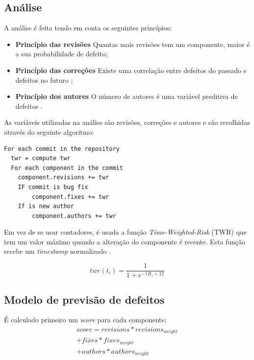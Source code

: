\documentclass[9pt,a4paper]{extarticle}
\begin{document}
\begin{multicols}{2}
\subsection{Análise}
A análise é feita tendo em conta os seguintes princípios:

\begin{itemize}
\item \textbf{Princípio das revisões} Quantas mais revisões tem um componente,
maior é a sua probabilidade de defeito\cite{859533};

\item \textbf{Princípio das correções} Existe uma correlação entre defeitos do
passado e defeitos no futuro \cite{Zimmermann:2007:PDE:1268984.1269057};

\item \textbf{Princípio dos autores} O número de autores é uma variável
preditiva de defeitos \cite{Moser:2008:CAE:1368088.1368114,D'Ambros:2012:EDP:2318097.2318149}.
\end{itemize}


As variáveis utilizadas na análise são revisões, correções e autores e são
recolhidas através do seguinte algoritmo:

\begin{verbatim}
For each commit in the repository
  twr = compute twr
  For each component in the commit
    component.revisions += twr
    IF commit is bug fix
        component.fixes += twr
    If is new author
        component.authors += twr
\end{verbatim}

Em vez de se usar contadores, é usada a função \emph{Time-Weighted-Risk} (TWR) que
tem um valor máximo quando a alteração do componente é recente. Esta função
recebe um \emph{timestamp} normalizado \cite{Chris2013}.

\begin{equation}
twr(t_i) = \frac{1}{1 + e^{-12t_i + 12 }}
\end{equation}

\subsection{Modelo de previsão de defeitos}
É calculado primeiro um \emph{score} para cada componente:
\begin{equation}
\begin{multlined}score = revisions * revisions_{weight} \\
+ fixes * fixes_{weight} \\
+ authors * authors_{weight} \\
\end{multlined}
\end{equation}


\end{multicols}
\end{document}
